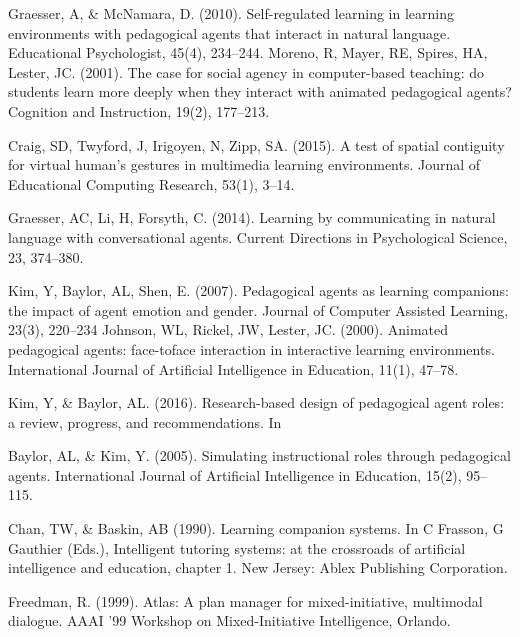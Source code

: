 \documentclass[letterpaper%
, twoside%
, 12pt%
,these%
, english%
,creativecommons,hyperref, withAlgo2e %
]{thETS}
\begin{document}
\begin{thebibliography}{01}
			Graesser, A, \& McNamara, D. (2010). Self-regulated learning in learning
		environments with pedagogical agents that interact in natural language.
		Educational Psychologist, 45(4), 234–244.
		Moreno, R, Mayer, RE, Spires, HA, Lester, JC. (2001). The case for social agency in
		computer-based teaching: do students learn more deeply when they
		interact with animated pedagogical agents? Cognition and Instruction, 19(2),
		177–213.
		
			Craig, SD, Twyford, J, Irigoyen, N, Zipp, SA. (2015). A test of spatial contiguity for
		virtual human’s gestures in multimedia learning environments. Journal of
		Educational Computing Research, 53(1), 3–14.
		
		
		Graesser, AC, Li, H, Forsyth, C. (2014). Learning by communicating in natural
		language with conversational agents. Current Directions in Psychological
		Science, 23, 374–380.
		

			Kim, Y, Baylor, AL, Shen, E. (2007). Pedagogical agents as learning companions:
		the impact of agent emotion and gender. Journal of Computer Assisted
		Learning, 23(3), 220–234
	Johnson, WL, Rickel, JW, Lester, JC. (2000). Animated pedagogical agents: face-toface interaction in interactive learning environments. International Journal of
	Artificial Intelligence in Education, 11(1), 47–78.	
		
			Kim, Y, \& Baylor, AL. (2016). Research-based design of pedagogical agent roles: a
		review, progress, and recommendations. In
		
		
				Baylor, AL, \& Kim, Y. (2005). Simulating instructional roles through pedagogical
		agents. International Journal of Artificial Intelligence in Education, 15(2), 95–115.
		
		
				Chan, TW, \& Baskin, AB (1990). Learning companion systems. In C Frasson, G
		Gauthier (Eds.), Intelligent tutoring systems: at the crossroads of artificial
		intelligence and education, chapter 1. New Jersey: Ablex Publishing Corporation.
	
	
		  Freedman, R. (1999). Atlas: A plan manager for mixed-initiative, multimodal dialogue. AAAI ’99 Workshop on Mixed-Initiative Intelligence, Orlando.
	

\end{thebibliography}
\end{document}

